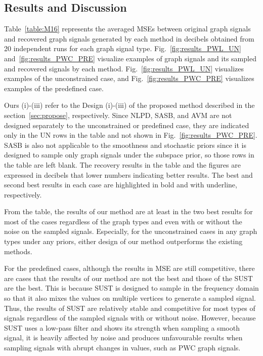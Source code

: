 \documentclass[journal]{IEEEtran}
\begin{document}
\subsection{Results and Discussion}





Table~\ref{table:M16} represents the averaged MSEs between original graph signals and recovered graph signals generated by each method in decibels obtained from 20 independent runs for each graph signal type.
Fig.~\ref{fig:results_PWL_UN} and~\ref{fig:results_PWC_PRE} visualize examples of graph signals and its sampled and recovered signals by each method. 
Fig.~\ref{fig:results_PWL_UN} visualizes examples of the unconstrained case, and Fig.~\ref{fig:results_PWC_PRE} visualizes examples of the predefined case.

Ours (i)-(iii) refer to the Design (i)-(iii) of the proposed method described in the section~\ref{sec:propose}, respectively.
Since NLPD, SASB, and AVM are not designed separately to the unconstrained or predefined case, they are indicated only in the UN rows in the table and not shown in Fig.~\ref{fig:results_PWC_PRE}.
SASB is also not applicable to the smoothness and stochastic priors since it is designed to sample only graph signals under the subspace prior, so those rows in the table are left blank.
The recovery results in the table and the figures are expressed in decibels that lower numbers indicating better results.
The best and second best results in each case are highlighted in bold and with underline, respectively.

From the table, the results of our method are at least in the two best results for most of the cases regardless of the graph types and even with or without the noise on the sampled signals.
Especially, for the unconstrained cases in any graph types under any priors, either design of our method outperforms the existing methods.

For the predefined cases, although the results in MSE are still competitive, there are cases that the results of our method are not the best and those of the SUST are the best.
This is because SUST is designed to sample in the frequency domain so that it also mixes the values on multiple vertices to generate a sampled signal.
Thus, the results of SUST are relatively stable and competitive for most types of signals regardless of the sampled signals with or without noise.
However, because SUST uses a low-pass filter and shows its strength when sampling a smooth signal, it is heavily affected by noise and produces unfavourable results when sampling signals with abrupt changes in values, such as PWC graph signals.
\end{document}
